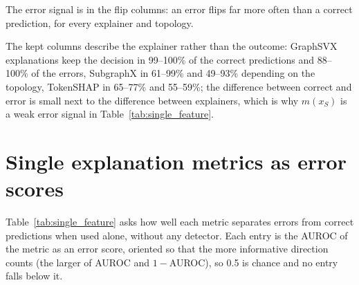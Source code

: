 \documentclass[review,12pt]{elsarticle}
\begin{document}
The error signal is in the flip columns: an error flips far more often than a correct prediction, for every explainer and topology.

The kept columns describe the explainer rather than the outcome: GraphSVX explanations keep the decision in 99--100\% of the correct predictions and 88--100\% of the errors, SubgraphX in 61--99\% and 49--93\% depending on the topology, TokenSHAP in 65--77\% and 55--59\%; the difference between correct and error is small next to the difference between explainers, which is why \(m(x_S)\) is a weak error signal in Table~\ref{tab:single_feature}.

\begin{table}[H]
\centering
\scriptsize
\setlength{\tabcolsep}{3pt}
\caption{Dimension 3 read as decisions, by explainer, graph type and correctness of the prediction (gold label). Flip: percentage of instances whose decision changes when the explanation is removed (\(m(x_{\setminus S})<0\)). Kept: percentage whose decision is reproduced by the explanation alone (\(m(x_S)>0\)). Fine-tuned node features, 20\% budget.}
\label{tab:margin_flips}
\end{table}

\section{Single explanation metrics as error scores}

Table~\ref{tab:single_feature} asks how well each metric separates errors from correct predictions when used alone, without any detector. Each entry is the AUROC of the metric as an error score, oriented so that the more informative direction counts (the larger of AUROC and \(1-\)AUROC), so 0.5 is chance and no entry falls below it.
\end{document}
